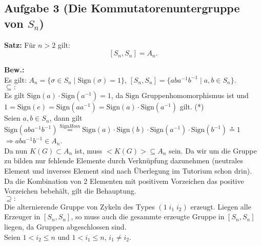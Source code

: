 \documentclass[11pt,a4paper,ngerman]{article}
\newcommand{\sign}{\text{Sign}}
\begin{document}

\subsection*{Aufgabe 3 \mdseries (Die Kommutatorenuntergruppe von $S_n$)}

\textbf{Satz:} Für $n>2$ gilt:
$$
\left[ S_n , S_n \right] = A_n.
$$

\textbf{Bew.:}\\

Es gilt:
$A_n = \{ \sigma \in S_n \; | \; \sign( \sigma ) = 1 \}$, $[S_n,S_n] = \{ aba^{-1}b^{-1} \; | \; a,b \in S_n\}$.\\

$\subseteq :$\\
Es gilt $\sign(a) \cdot \sign(a^{-1}) = 1$, da $\sign$ Gruppenhomomorphismus ist und \\
$1 = \sign(e) = \sign(a a^{-1}) = \sign(a) \cdot \sign(a^{-1})$ gilt. (*)\\

Seien $a,b \in S_n$, dann gilt\\
$\sign (aba^{-1}b^{-1}) \stackrel{\sign Hom}{=} \sign(a) \cdot \sign(b) \cdot \sign(a^{-1}) \cdot \sign(b^{-1}) \stackrel{*}{=} 1$\\
$\Rightarrow aba^{-1}b^{-1} \in A_n$.\\

Da nun $K(G) \subset A_n$ ist, muss $<K(G)> \subseteq A_n$ sein. Da wir um die Gruppe zu bilden nur fehlende Elemente durch Verknüpfung dazunehmen (neutrales Element und inverses Element sind nach Überlegung im Tutorium schon drin). Da die Kombination von 2 Elementen mit positivem Vorzeichen das positive Vorzeichen bebehält, gilt die Behauptung.\\

$\supseteq :$\\

Die alternierende Gruppe von Zykeln des Types $(1 \; i_1 \; i_2)$ erzeugt. Liegen alle Erzeuger in $[S_n, S_n]$, so muss auch die gesammte erzeugte Gruppe in $[S_n,S_n]$ liegen, da Gruppen abgeschlossen sind.\\

Seien $1 < i_2 \leq n$ und $1 < i_1 \leq n$, $i_1 \not= i_2$.\\

\end{document}
